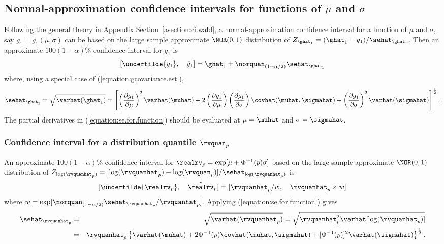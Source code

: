 \subsection{Normal-approximation
confidence intervals for functions of $\mu$ and $\sigma$}
\label{section:norm.conf.int.for.ls.fun}
Following the general theory in Appendix
Section~\ref{asection:ci.wald}, a normal-approximation confidence
interval for a function of $\mu$ and $\sigma$, say $g_{1}=g_{1}(\mu,
\sigma)$ can be based on the 
large sample approximate $\NOR(0,1)$ distribution of
$Z_{\ghat_{1}}=(\ghat_{1}-g_{1})/\sehat_{\ghat_{1}}$.
Then an approximate $100(1-\alpha)$\% confidence
interval for $g_{1}$ is
\begin{equation} 
\label{equation:ci.for.function}
[\undertilde{g_{1}}, \quad \tilde{g}_{1}] =
\ghat_{1} \pm 	 \norquan_{(1-\alpha/2)} \sehat_{\ghat_{1}}
\end{equation}
where, using a special case of (\ref{equation:gcovariance.est}),
\begin{equation}
\label{equation:se.for.function}
\sehat_{\ghat_{1}}=\sqrt{\varhat(\ghat_{1})} =
\left  [
\left(\frac{\partial g_{1}}{\partial \mu}\right)^{2}\varhat(\muhat)+
2\left(\frac{\partial g_{1}}{\partial \mu}\right)
\left(\frac{\partial g_{1}}{\partial
\sigma}\right)\covhat(\muhat,\sigmahat)
+\left(\frac{\partial g_{1}}{\partial \sigma}\right)^{2}\varhat(\sigmahat)
\right ]^{\frac{1}{2}}. 
\end{equation}
The partial derivatives in (\ref{equation:se.for.function}) should be
evaluated at $\mu=\muhat$ and $\sigma=\sigmahat$.  

\subsubsection{Confidence interval for a 
distribution  quantile $\rvquan_{p}$}

An approximate $100(1-\alpha)\%$ confidence interval for
$\realrv_{p}=\exp[\mu + \Phi^{-1}(p)\sigma]$ based on the large-sample
approximate $\NOR(0,1)$ distribution of $Z_{\log(\rvquanhat_{p})}=
[\log(\rvquanhat_{p})-\log(\rvquan_{p})]/\sehat_{\log(\rvquanhat_{p})}$
is
\begin{equation}
\label{equation:norm.approx.for.quant}
[ \undertilde{\realrv_{p}},\quad \tilde{\realrv}_{p} ]=
[\rvquanhat_{p}/w,
\quad \rvquanhat_{p} \times w]
\end{equation}
where $w=\exp[\norquan_{(1-\alpha/2)}\sehat_{\rvquanhat_{p}}/\rvquanhat_{p}]$. 
Applying (\ref{equation:se.for.function}) gives
\begin{eqnarray}
	\sehat_{\rvquanhat_{p}}& =& \sqrt{\varhat(\rvquanhat_{p})} 
  	=\sqrt{\rvquanhat_{p}^2 \varhat[\log(\rvquanhat_{p})]} \nonumber\\
	&=& \rvquanhat_{p} \left \{ \varhat(\muhat) + 
	 2 \Phi^{-1}(p) \covhat(\muhat,\sigmahat) +
	[\Phi^{-1}(p)]^2 \varhat(\sigmahat) \right\}^{\frac{1}{2}} .
\label{equation:ls.quant.sehat}
\end{eqnarray}

